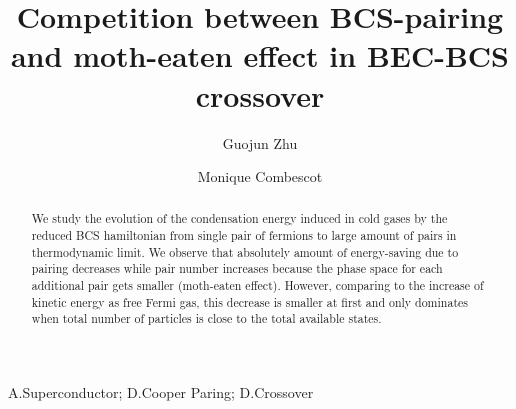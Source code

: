 \documentclass[3p,twocolumn]{elsarticle}
\begin{document}
\title{Competition between BCS-pairing and moth-eaten effect in BEC-BCS crossover}
\author[uiuc]{Guojun Zhu}
\author[uiuc,upmc]{Monique Combescot}

\address[uiuc]{Department of Physics, University of Illinois at Urbana-Champaign, 1110 W Green St, Urbana, IL, 61801}

\address[upmc]{Institut des NanoSciences de Paris, Universite Pierre et Marie Curie, CNRS, Tour 22, 4 place Jussieu, 75005 Paris }

\newcommand{\td}{{\ensuremath{{\text{(2D)}}}}}
\newcommand{\sd}{{\ensuremath{{\text{(3D)}}}}}
\newcommand{\Arctg}{\ensuremath{\text{Arctg}}}



\begin{abstract}
We study the evolution of the condensation energy induced in cold gases by the  reduced BCS hamiltonian from single pair of fermions to large amount of pairs in thermodynamic limit.  We observe that absolutely amount of energy-saving due to pairing decreases while pair number increases because the phase space for each additional pair gets smaller (moth-eaten effect).  However, comparing to the increase of kinetic energy as free Fermi gas, this decrease is smaller at first and only dominates  when total number of particles is close to the total available states.  
\end{abstract}
\begin{keyword}
A.Superconductor; D.Cooper Paring; D.Crossover
\end{keyword}

\maketitle
\end{document}
